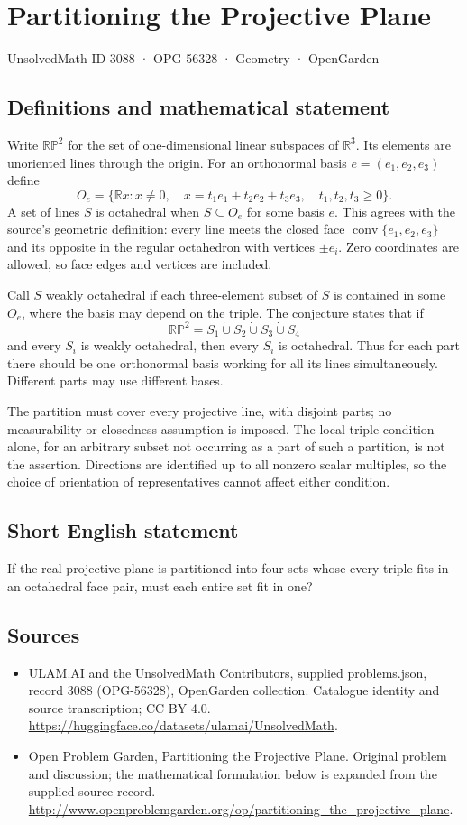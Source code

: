 \documentclass[11pt,a4paper]{article}
\begin{document}
\section*{Partitioning the Projective Plane}\label{3088}
{\small UnsolvedMath ID 3088 · OPG-56328 · Geometry · OpenGarden}
\subsection{Definitions and mathematical statement}
Write $\mathbb{RP}^2$ for the set of one-dimensional linear subspaces of
$\mathbb R^3$. Its elements are unoriented lines through the origin.
For an orthonormal basis $e=(e_1,e_2,e_3)$ define
\[
 O_e=\{\mathbb R x:x\ne0,\quad
                x=t_1e_1+t_2e_2+t_3e_3,\quad t_1,t_2,t_3\ge0\}.
\]
A set of lines $S$ is octahedral when $S\subseteq O_e$ for some basis $e$.
This agrees with the source's geometric definition: every line meets
the closed face $\operatorname{conv}\{e_1,e_2,e_3\}$ and its opposite in
the regular octahedron with vertices $\pm e_i$. Zero coordinates are allowed,
so face edges and vertices are included.

Call $S$ weakly octahedral if each three-element subset of $S$ is
contained in some $O_e$, where the basis may depend on the triple.
The conjecture states that if
\[
 \mathbb{RP}^2=S_1\mathbin{\dot\cup}S_2\mathbin{\dot\cup}S_3
                         \mathbin{\dot\cup}S_4
\]
and every $S_i$ is weakly octahedral, then every $S_i$ is octahedral.
Thus for each part there should be one orthonormal basis working for
all its lines simultaneously. Different parts may use different bases.

The partition must cover every projective line, with disjoint parts;
no measurability or closedness assumption is imposed. The local triple
condition alone, for an arbitrary subset not occurring as a part of such
a partition, is not the assertion. Directions are identified up to all
nonzero scalar multiples, so the choice of orientation of representatives
cannot affect either condition.
\subsection{Short English statement}
If the real projective plane is partitioned into four sets whose every triple fits in an octahedral face pair, must each entire set fit in one?
\subsection{Sources}
\begin{itemize}
\item[S1] ULAM.AI and the UnsolvedMath Contributors, supplied problems.json, record 3088 (OPG-56328), OpenGarden collection. Catalogue identity and source transcription; CC BY 4.0.
\url{https://huggingface.co/datasets/ulamai/UnsolvedMath}.
\item[S2] Open Problem Garden, Partitioning the Projective Plane. Original problem and discussion; the mathematical formulation below is expanded from the supplied source record.
\url{http://www.openproblemgarden.org/op/partitioning_the_projective_plane}.
\end{itemize}
\end{document}
